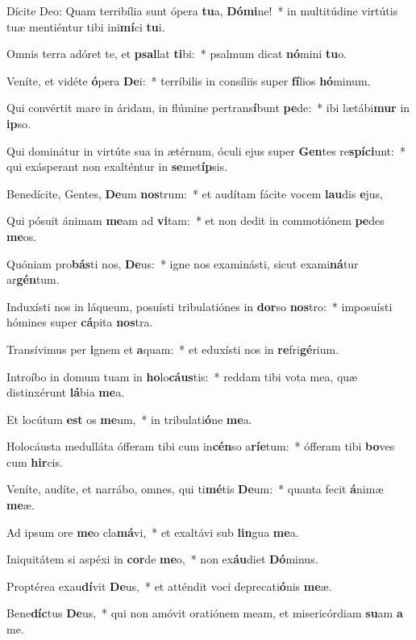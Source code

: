 \item Dícite Deo: Quam terribília sunt ópera \textbf{tu}a, \textbf{Dó}\textbf{mi}ne!~* in multitúdine virtútis tuæ mentiéntur tibi ini\textbf{mí}ci \textbf{tu}i.
\item Omnis terra adóret te, et \textbf{psal}lat \textbf{ti}bi:~* psalmum dicat \textbf{nó}mini \textbf{tu}o.
\item Veníte, et vidéte \textbf{ó}pera \textbf{De}i:~* terríbilis in consíliis super \textbf{fí}lios \textbf{hó}minum.
\item Qui convértit mare in áridam, in flúmine pertrans\textbf{í}bunt \textbf{pe}de:~* ibi lætábi\textbf{mur} in \textbf{ip}so.
\item Qui dominátur in virtúte sua in ætérnum, óculi ejus super \textbf{Gen}tes re\textbf{spí}\textbf{ci}unt:~* qui exásperant non exalténtur in \textbf{se}met\textbf{íp}sis.
\item Benedícite, Gentes, \textbf{De}um \textbf{nos}trum:~* et audítam fácite vocem \textbf{lau}dis \textbf{e}jus,
\item Qui pósuit ánimam \textbf{me}am ad \textbf{vi}tam:~* et non dedit in commotiónem \textbf{pe}des \textbf{me}os.
\item Quóniam pro\textbf{bás}ti nos, \textbf{De}us:~* igne nos examinásti, sicut exami\textbf{ná}tur ar\textbf{gén}tum.
\item Induxísti nos in láqueum, posuísti tribulatiónes in \textbf{dor}so \textbf{nos}tro:~* imposuísti hómines super \textbf{cá}pita \textbf{nos}tra.
\item Transívimus per \textbf{i}gnem et \textbf{a}quam:~* et eduxísti nos in \textbf{re}fri\textbf{gé}rium.
\item Introíbo in domum tuam in \textbf{ho}lo\textbf{cáus}tis:~* reddam tibi vota mea, quæ distinxérunt \textbf{lá}bia \textbf{me}a.
\item Et locútum \textbf{est} os \textbf{me}um,~* in tribulati\textbf{ó}ne \textbf{me}a.
\item Holocáusta medulláta ófferam tibi cum in\textbf{cén}so a\textbf{rí}\textbf{e}tum:~* ófferam tibi \textbf{bo}ves cum \textbf{hir}cis.
\item Veníte, audíte, et narrábo, omnes, qui ti\textbf{mé}tis \textbf{De}um:~* quanta fecit \textbf{á}nimæ \textbf{me}æ.
\item Ad ipsum ore \textbf{me}o cla\textbf{má}vi,~* et exaltávi sub \textbf{lin}gua \textbf{me}a.
\item Iniquitátem si aspéxi in \textbf{cor}de \textbf{me}o,~* non ex\textbf{áu}diet \textbf{Dó}minus.
\item Proptérea exau\textbf{dí}vit \textbf{De}us,~* et atténdit voci deprecati\textbf{ó}nis \textbf{me}æ.
\item Bene\textbf{díc}tus \textbf{De}us,~* qui non amóvit oratiónem meam, et misericórdiam \textbf{su}am \textbf{a} me.
